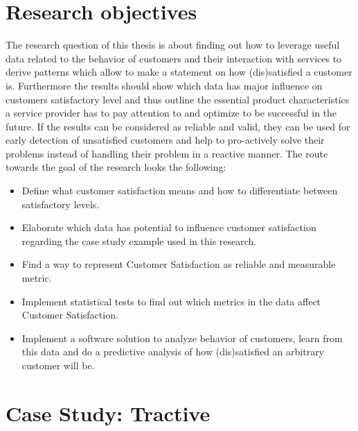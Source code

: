 \section{Research objectives}
The research question of this thesis is about finding out how to leverage useful data related to the behavior of customers and their interaction with services to derive patterns which allow to make a statement on how (dis)satisfied a customer is. Furthermore the results should show which data has major influence on customers satisfactory level and thus outline the essential product characteristics a service provider has to pay attention to and optimize to be successful in the future. If the results can be considered as reliable and valid, they can be used for early detection of unsatisfied customers and help to pro-actively solve their problems instead of handling their problem in a reactive manner.
The route towards the goal of the research looks the following:

\begin{itemize}
	\item Define what customer satisfaction means and how to differentiate between satisfactory levels.
	\item Elaborate which data has potential to influence customer satisfaction regarding the case study example used in this research. 
	\item Find a way to represent Customer Satisfaction as reliable and measurable metric.
	\item Implement statistical tests to find out which metrics in the data affect Customer Satisfaction. 
	\item Implement a software solution to analyze behavior of customers, learn from this data and do a predictive analysis of how (dis)satisfied an arbitrary customer will be.
\end{itemize}

\section{Case Study: Tractive}
\label{sec:illustrationExample}


